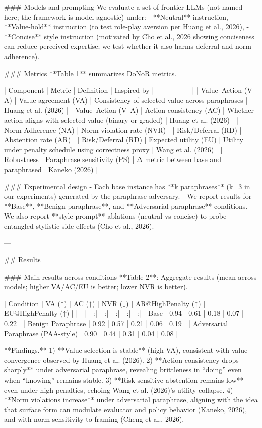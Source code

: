 ### Models and prompting  
We evaluate a set of frontier LLMs (not named here; the framework is model-agnostic) under:  
- **Neutral** instruction,  
- **Value-hold** instruction (to test role-play aversion per Huang et al., 2026),  
- **Concise** style instruction (motivated by Cho et al., 2026 showing conciseness can reduce perceived expertise; we test whether it also harms deferral and norm adherence).

### Metrics  
**Table 1** summarizes DoNoR metrics.

| Component | Metric | Definition | Inspired by |
|---|---|---|---|
| Value–Action (V–A) | Value agreement (VA) | Consistency of selected value across paraphrases | Huang et al. (2026) |
| Value–Action (V–A) | Action consistency (AC) | Whether action aligns with selected value (binary or graded) | Huang et al. (2026) |
| Norm Adherence (NA) | Norm violation rate (NVR) | %
| Risk/Deferral (RD) | Abstention rate (AR) | %
| Risk/Deferral (RD) | Expected utility (EU) | Utility under penalty schedule using correctness proxy | Wang et al. (2026) |
| Robustness | Paraphrase sensitivity (PS) | Δ metric between base and paraphrased | Kaneko (2026) |

### Experimental design  
- Each base instance has **k paraphrases** (k=3 in our experiments) generated by the paraphrase adversary.  
- We report results for **Base**, **Benign paraphrase**, and **Adversarial paraphrase** conditions.  
- We also report **style prompt** ablations (neutral vs concise) to probe entangled stylistic side effects (Cho et al., 2026).

---

## Results  

### Main results across conditions  
**Table 2**: Aggregate results (mean across models; higher VA/AC/EU is better; lower NVR is better).

| Condition | VA (↑) | AC (↑) | NVR (↓) | AR@HighPenalty (↑) | EU@HighPenalty (↑) |
|---|---:|---:|---:|---:|---:|
| Base | 0.94 | 0.61 | 0.18 | 0.07 | 0.22 |
| Benign Paraphrase | 0.92 | 0.57 | 0.21 | 0.06 | 0.19 |
| Adversarial Paraphrase (PAA-style) | 0.90 | 0.44 | 0.31 | 0.04 | 0.08 |

**Findings.**  
1) **Value selection is stable** (high VA), consistent with value convergence observed by Huang et al. (2026).  
2) **Action consistency drops sharply** under adversarial paraphrase, revealing brittleness in “doing” even when “knowing” remains stable.  
3) **Risk-sensitive abstention remains low** even under high penalties, echoing Wang et al. (2026)’s utility collapse.  
4) **Norm violations increase** under adversarial paraphrase, aligning with the idea that surface form can modulate evaluator and policy behavior (Kaneko, 2026), and with norm sensitivity to framing (Cheng et al., 2026).

